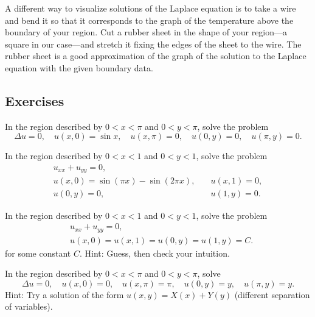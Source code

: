 A different
way to visualize solutions of the Laplace equation is to
take a wire and bend
it so that it corresponds to the graph of the
temperature above the boundary of your region.  Cut a rubber sheet in
the shape of your region---a square in our case---and stretch it
fixing the edges of the sheet to the wire.
The rubber sheet is a good approximation of the graph of the solution to
the Laplace equation with the given boundary data.

\subsection{Exercises}

\begin{exercise}
In the region described by $0 < x < \pi$ and $0 < y < \pi$,
solve the problem
\begin{equation*}
\Delta u = 0, \quad u(x,0) = \sin x, \quad u(x,\pi) = 0,
\quad u(0,y) = 0, 
\quad u(\pi,y) = 0 .
\end{equation*}
\end{exercise}

\begin{exercise}
In the region described by $0 < x < 1$ and $0 < y < 1$,
solve the problem
\begin{equation*}
\begin{array}{ll}
u_{xx} + u_{yy} = 0, & \\
u(x,0) = \sin (\pi x) - \sin (2\pi x), \quad & u(x,1) = 0, \\
u(0,y) = 0, \quad & u(1,y) = 0 .
\end{array}
\end{equation*}
\end{exercise}

\begin{exercise}
In the region described by $0 < x < 1$ and $0 < y < 1$,
solve the problem
\begin{align*}
& u_{xx} + u_{yy} = 0, \\
& u(x,0) = u(x,1) = u(0,y) = u(1,y) = C .
\end{align*}
for some constant $C$.  Hint: Guess, then check your intuition.
\end{exercise}

\begin{exercise} \label{dirich:diffsepexr}
In the region described by $0 < x < \pi$ and $0 < y < \pi$,
solve
\begin{equation*}
\Delta u = 0,
\quad u(x,0) = 0,
\quad u(x,\pi) = \pi,
\quad u(0,y) = y,
\quad u(\pi,y) = y .
\end{equation*}
Hint: Try a solution of the form $u(x,y) = X(x) + Y(y)$ (different separation
of variables).
\end{exercise}

